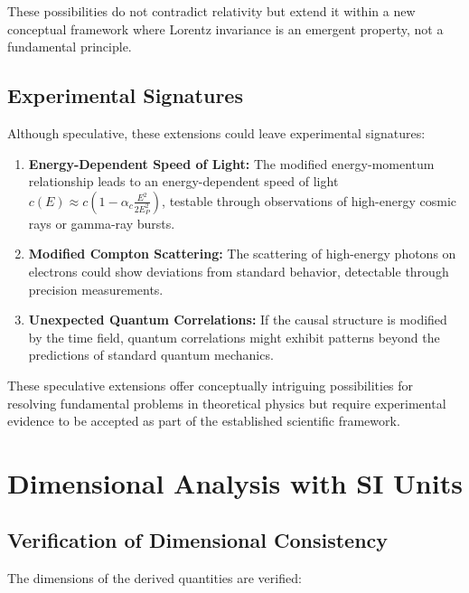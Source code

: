 \documentclass[12pt,a4paper]{article}
\begin{document}
	These possibilities do not contradict relativity but extend it within a new conceptual framework where Lorentz invariance is an emergent property, not a fundamental principle.
	
	\subsection{Experimental Signatures}
	
	Although speculative, these extensions could leave experimental signatures:
	
	\begin{enumerate}
		\item \textbf{Energy-Dependent Speed of Light:} The modified energy-momentum relationship leads to an energy-dependent speed of light \(c(E) \approx c (1 - \alpha_c \frac{E^2}{2E_P^2})\), testable through observations of high-energy cosmic rays or gamma-ray bursts.
		\item \textbf{Modified Compton Scattering:} The scattering of high-energy photons on electrons could show deviations from standard behavior, detectable through precision measurements.
		\item \textbf{Unexpected Quantum Correlations:} If the causal structure is modified by the time field, quantum correlations might exhibit patterns beyond the predictions of standard quantum mechanics.
	\end{enumerate}
	
	These speculative extensions offer conceptually intriguing possibilities for resolving fundamental problems in theoretical physics but require experimental evidence to be accepted as part of the established scientific framework.
	
	\section{Dimensional Analysis with SI Units}
	
	\subsection{Verification of Dimensional Consistency}
	
	The dimensions of the derived quantities are verified:
	
\end{document}
